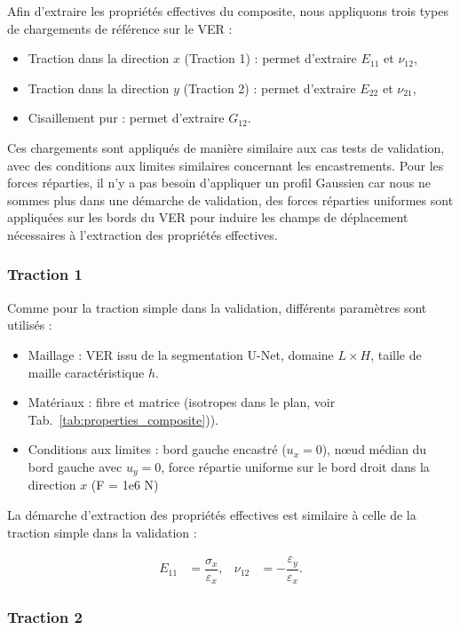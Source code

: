 \documentclass[a4paper,11pt]{article}
\begin{document}
Afin d'extraire les propriétés effectives du composite, nous appliquons trois types de chargements de référence sur le VER :
\begin{itemize}
    \item Traction dans la direction $x$ (Traction 1) : permet d'extraire $E_{11}$ et $\nu_{12}$,
    \item Traction dans la direction $y$ (Traction 2) : permet d'extraire $E_{22}$ et $\nu_{21}$,
    \item Cisaillement pur : permet d'extraire $G_{12}$.
\end{itemize}

Ces chargements sont appliqués de manière similaire aux cas tests de validation, avec des conditions aux limites similaires concernant les encastrements. Pour les forces réparties, il n'y a pas besoin d'appliquer un profil Gaussien car nous ne sommes plus dans une démarche de validation, des forces réparties uniformes sont appliquées sur les bords du VER pour induire les champs de déplacement nécessaires à l'extraction des propriétés effectives. \\
\subsubsection*{Traction 1}

Comme pour la traction simple dans la validation, différents paramètres sont utilisés :
\begin{itemize}
    \item Maillage : VER issu de la segmentation U-Net, domaine $L \times H$, taille de maille caractéristique $h$.
    \item Matériaux : fibre et matrice (isotropes dans le plan, voir Tab.~\ref{tab:properties_composite})).
    \item Conditions aux limites : bord gauche encastré ($u_x = 0$), nœud médian du bord gauche avec $u_y = 0$, force répartie uniforme sur le bord droit dans la direction $x$ (F = 1e6 N)
\end{itemize}

La démarche d'extraction des propriétés effectives est similaire à celle de la traction simple dans la validation :

\begin{align}
    E_{11} &= \dfrac{\sigma_x}{\varepsilon_x},
    & \nu_{12} &= -\dfrac{\varepsilon_y}{\varepsilon_x}.
\end{align}

\subsubsection*{Traction 2}
\end{document}
